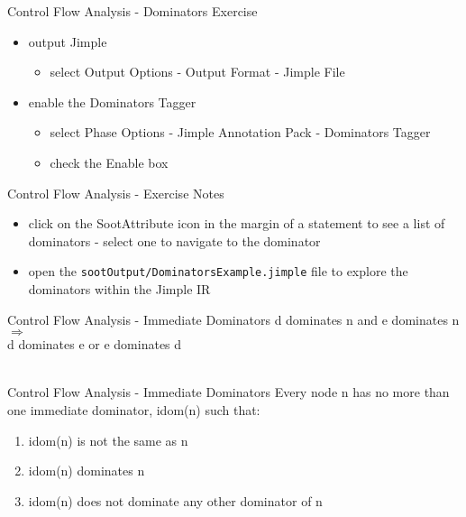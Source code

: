 \documentclass[mcgill,slideColor,colorBG,pdf]{prosper}
\begin{document}
\begin{slide} {Control Flow Analysis - Dominators Exercise}
\begin{itemize}
\item output Jimple
\begin{itemize}
\item select Output Options - Output Format - Jimple File
\end{itemize}
\item enable the Dominators Tagger
\begin{itemize}
\item select Phase Options - Jimple Annotation Pack - Dominators Tagger
\item check the Enable box
\end{itemize}
\end{itemize}
\end{slide}

\begin{slide} {Control Flow Analysis - Exercise Notes}
\begin{itemize}
\item click on the SootAttribute icon
in the margin of a statement to see a list of dominators - select one to navigate to the dominator
\item open the \texttt{sootOutput/DominatorsExample.jimple} file to explore the dominators within the Jimple IR
\end{itemize}
\end{slide}

\begin{slide} {Control Flow Analysis - Immediate Dominators}
d dominates n and e dominates n $\Rightarrow$ \\d dominates e or e dominates d\\
\ \\
\begin{center}
\end{center}
\end{slide}

\begin{slide} {Control Flow Analysis - Immediate Dominators}
Every node n has no more than one immediate dominator, idom(n) such that:
\begin{enumerate}
\item idom(n) is not the same as n
\item idom(n) dominates n
\item idom(n) does not dominate any other dominator of n
\end{enumerate}
\begin{center}
\end{center}
\end{slide}
\end{document}
